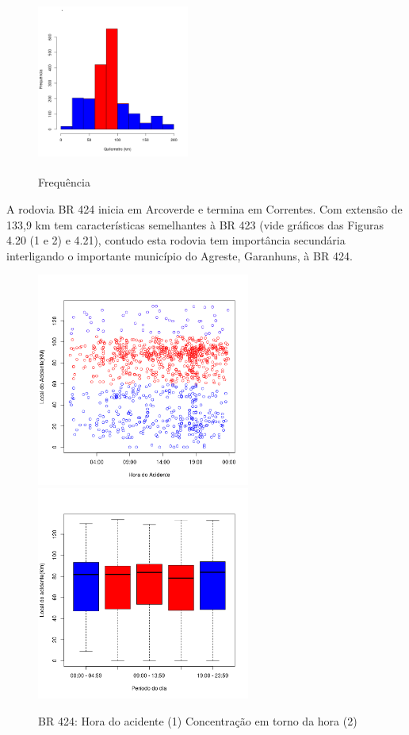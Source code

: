 \quad \quad
\begin{figure}[h]
	\centering
	\caption{ Frequência}
	\includegraphics[width=5cm,height=6cm]{Figuras/Preprocess/br423_3.png}
\end{figure}


\pagebreak

A rodovia BR 424 inicia em Arcoverde e termina em Correntes. Com extensão de 133,9 km tem características semelhantes à BR 423 (vide gráficos das Figuras 4.20 (1 e 2) e 4.21), contudo esta rodovia tem importância secundária interligando o importante município do Agreste, Garanhuns, à BR 424.

\begin{figure}[h]
	\caption{BR 424: Hora do acidente (1) Concentração em torno da hora (2)}
	\includegraphics[width=7cm,height=7cm]{Figuras/Preprocess/br424_1.png}
	\includegraphics[width=7cm,height=7cm]{Figuras/Preprocess/br424_2.png}
	
\end{figure}

